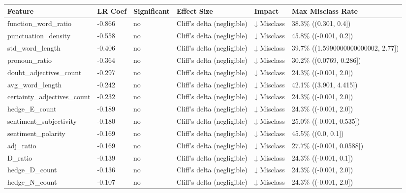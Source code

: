 \begin{tabular}{llllll}
\toprule
Feature & LR Coef & Significant & Effect Size & Impact & Max Misclass Rate \\
\midrule
function\_word\_ratio & -0.866 & no & Cliff's delta (negligible) & ↓ Misclass & 38.3\% ((0.301, 0.4]) \\
punctuation\_density & -0.558 & no & Cliff's delta (negligible) & ↓ Misclass & 45.8\% ((-0.001, 0.2]) \\
std\_word\_length & -0.406 & no & Cliff's delta (negligible) & ↓ Misclass & 39.7\% ((1.5990000000000002, 2.77]) \\
pronoun\_ratio & -0.364 & no & Cliff's delta (negligible) & ↓ Misclass & 30.2\% ((0.0769, 0.286]) \\
doubt\_adjectives\_count & -0.297 & no & Cliff's delta (negligible) & ↓ Misclass & 24.3\% ((-0.001, 2.0]) \\
avg\_word\_length & -0.242 & no & Cliff's delta (negligible) & ↓ Misclass & 42.1\% ((3.901, 4.415]) \\
certainty\_adjectives\_count & -0.232 & no & Cliff's delta (negligible) & ↓ Misclass & 24.3\% ((-0.001, 2.0]) \\
hedge\_E\_count & -0.189 & no & Cliff's delta (negligible) & ↓ Misclass & 24.3\% ((-0.001, 2.0]) \\
sentiment\_subjectivity & -0.180 & no & Cliff's delta (negligible) & ↓ Misclass & 25.0\% ((-0.001, 0.535]) \\
sentiment\_polarity & -0.169 & no & Cliff's delta (negligible) & ↓ Misclass & 45.5\% ((0.0, 0.1]) \\
adj\_ratio & -0.169 & no & Cliff's delta (negligible) & ↓ Misclass & 27.7\% ((-0.001, 0.0588]) \\
D\_ratio & -0.139 & no & Cliff's delta (negligible) & ↓ Misclass & 24.3\% ((-0.001, 0.1]) \\
hedge\_D\_count & -0.136 & no & Cliff's delta (negligible) & ↓ Misclass & 24.3\% ((-0.001, 2.0]) \\
hedge\_N\_count & -0.107 & no & Cliff's delta (negligible) & ↓ Misclass & 24.3\% ((-0.001, 2.0]) \\
\bottomrule
\end{tabular}
